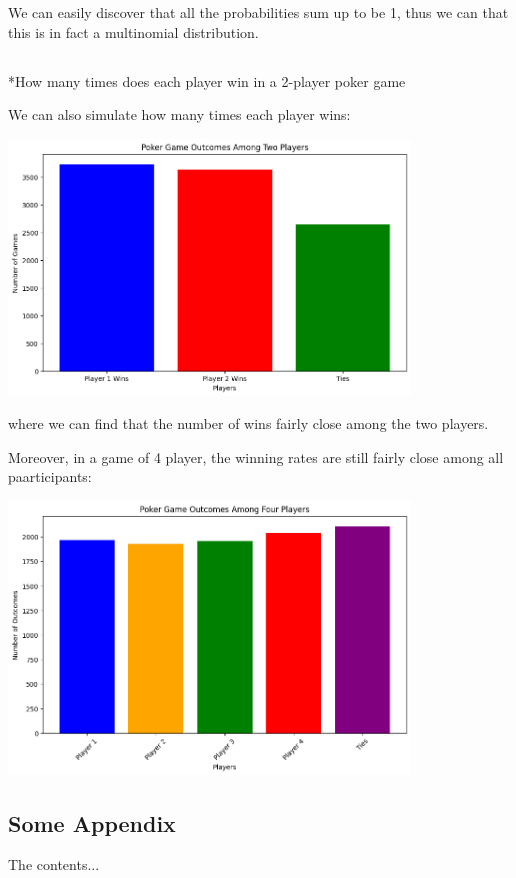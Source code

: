 \documentclass{article}
\begin{document}
We can easily discover that all the probabilities sum up to be 1, thus 
we can that this is in fact a multinomial distribution. 




\section{}*{How many times does each player win in a 2-player poker game}

We can also simulate how many times each player wins:

\begin{center}
    \includegraphics[width = 0.8\textwidth]{images/win_rate_2_player.png}
\end{center}

where we can find that the number of wins fairly close among the 
two players.

Moreover, in a game of 4 player, the winning rates are still fairly close 
among all paarticipants:

\begin{center}
    \includegraphics[width = 0.8\textwidth]{images/win_rate_4_player.png}
\end{center}

\begin{appendices}
\chapter{Some Appendix}
    The contents...
\end{appendices}
\end{document}
